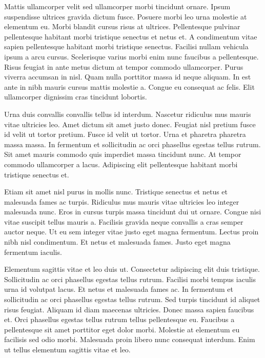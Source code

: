 Mattis ullamcorper velit sed ullamcorper morbi tincidunt ornare. Ipsum suspendisse ultrices gravida dictum fusce. Posuere morbi leo urna molestie at elementum eu. Morbi blandit cursus risus at ultrices. Pellentesque pulvinar pellentesque habitant morbi tristique senectus et netus et. A condimentum vitae sapien pellentesque habitant morbi tristique senectus. Facilisi nullam vehicula ipsum a arcu cursus. Scelerisque varius morbi enim nunc faucibus a pellentesque. Risus feugiat in ante metus dictum at tempor commodo ullamcorper. Purus viverra accumsan in nisl. Quam nulla porttitor massa id neque aliquam. In est ante in nibh mauris cursus mattis molestie a. Congue eu consequat ac felis. Elit ullamcorper dignissim cras tincidunt lobortis.

Urna duis convallis convallis tellus id interdum. Nascetur ridiculus mus mauris vitae ultricies leo. Amet dictum sit amet justo donec. Feugiat nisl pretium fusce id velit ut tortor pretium. Fusce id velit ut tortor. Urna et pharetra pharetra massa massa. In fermentum et sollicitudin ac orci phasellus egestas tellus rutrum. Sit amet mauris commodo quis imperdiet massa tincidunt nunc. At tempor commodo ullamcorper a lacus. Adipiscing elit pellentesque habitant morbi tristique senectus et.

Etiam sit amet nisl purus in mollis nunc. Tristique senectus et netus et malesuada fames ac turpis. Ridiculus mus mauris vitae ultricies leo integer malesuada nunc. Eros in cursus turpis massa tincidunt dui ut ornare. Congue nisi vitae suscipit tellus mauris a. Facilisis gravida neque convallis a cras semper auctor neque. Ut eu sem integer vitae justo eget magna fermentum. Lectus proin nibh nisl condimentum. Et netus et malesuada fames. Justo eget magna fermentum iaculis.

Elementum sagittis vitae et leo duis ut. Consectetur adipiscing elit duis tristique. Sollicitudin ac orci phasellus egestas tellus rutrum. Facilisi morbi tempus iaculis urna id volutpat lacus. Et netus et malesuada fames ac. In fermentum et sollicitudin ac orci phasellus egestas tellus rutrum. Sed turpis tincidunt id aliquet risus feugiat. Aliquam id diam maecenas ultricies. Donec massa sapien faucibus et. Orci phasellus egestas tellus rutrum tellus pellentesque eu. Faucibus a pellentesque sit amet porttitor eget dolor morbi. Molestie at elementum eu facilisis sed odio morbi. Malesuada proin libero nunc consequat interdum. Enim ut tellus elementum sagittis vitae et leo.
